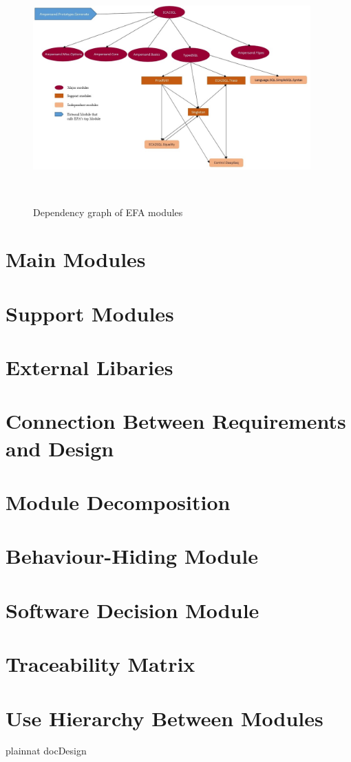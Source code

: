 \documentclass[12pt]{article}
\begin{document}
\begin{figure}
    \centering
    \includegraphics[width=0.95\textwidth]{../DesignDoc/depent_tree}
    \caption{Dependency graph of EFA modules}~\label{fig:figure1}
\end{figure}


\section{Main Modules}

\section{Support Modules}

\section{External Libaries}

\section{Connection Between Requirements and Design} \label{SecConnection}


\section{Module Decomposition} \label{SecMD}

\section{Behaviour-Hiding Module}

\section{Software Decision Module}

\section{Traceability Matrix} \label{SecTM}

\section{Use Hierarchy Between Modules} \label{SecUse}




 {plainnat}
 {docDesign}
\end{document}
